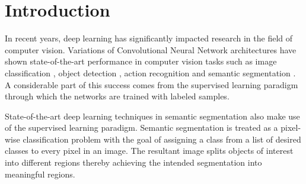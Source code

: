 
\chapter{Introduction}

In recent years, deep learning has significantly impacted research in the field of computer vision. Variations of Convolutional Neural Network architectures have shown state-of-the-art performance in computer vision tasks such as image classification \cite{DBLP:journals/corr/HeZRS15}, object detection \cite{DBLP:journals/corr/RedmonDGF15}, action recognition \cite{DBLP:journals/corr/SimonyanZ14} and semantic segmentation \cite{DBLP:journals/corr/abs-1802-02611}. A considerable part of this success comes from the supervised learning paradigm through which the networks are trained with labeled samples.

State-of-the-art deep learning techniques in semantic segmentation also make use of the supervised learning paradigm. Semantic segmentation is treated as a pixel-wise classification problem with the goal of assigning a class from a list of desired classes to every pixel in an image. The resultant image splits objects of interest into different regions thereby achieving the intended segmentation into meaningful regions.

